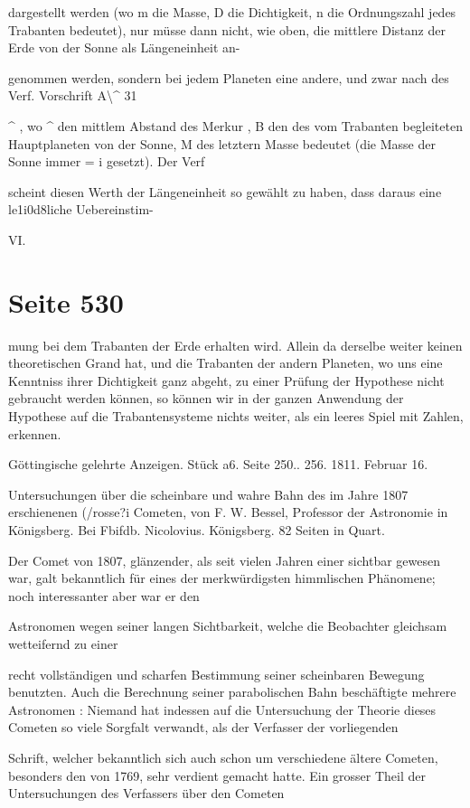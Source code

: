 \documentclass[10pt,a4paper]{article}
\begin{document}
dargestellt werden (wo m die Masse, D die Dichtigkeit, n die Ordnungszahl jedes Trabanten bedeutet), nur müsse dann nicht, wie oben, die mittlere Distanz der Erde von der Sonne als Längeneinheit an-

genommen werden, sondern bei jedem Planeten eine andere, und zwar nach des Verf. Vorschrift A\textbackslash{}\textasciicircum{} 31

\textasciicircum{} , wo \textasciicircum{} den mittlem Abstand des Merkur , B den des vom Trabanten begleiteten Hauptplaneten von der Sonne, M des letztern Masse bedeutet (die Masse der Sonne immer = i gesetzt). Der Verf

scheint diesen Werth der Längeneinheit so gewählt zu haben, dass daraus eine le1i0d8liche Uebereinstim-

VI.


\newpage
\section*{Seite 530}
mung bei dem Trabanten der Erde erhalten wird. Allein da derselbe weiter keinen theoretischen Grand hat, und die Trabanten der andern Planeten, wo uns eine Kenntniss ihrer Dichtigkeit ganz abgeht, zu einer Prüfung der Hypothese nicht gebraucht werden können, so können wir in der ganzen Anwendung der Hypothese auf die Trabantensysteme nichts weiter, als ein leeres Spiel mit Zahlen, erkennen.

Göttingische gelehrte Anzeigen. Stück a6. Seite 250.. 256. 1811. Februar 16.

Untersuchungen über die scheinbare und wahre Bahn des im Jahre 1807 erschienenen (/rosse?i Cometen, von F. W. Bessel, Professor der Astronomie in Königsberg. Bei Fbifdb. Nicolovius. Königsberg. 82 Seiten in Quart.

Der Comet von 1807, glänzender, als seit vielen Jahren einer sichtbar gewesen war, galt bekanntlich für eines der merkwürdigsten himmlischen Phänomene; noch interessanter aber war er den

Astronomen wegen seiner langen Sichtbarkeit, welche die Beobachter gleichsam wetteifernd zu einer

recht vollständigen und scharfen Bestimmung seiner scheinbaren Bewegung benutzten. Auch die Berechnung seiner parabolischen Bahn beschäftigte mehrere Astronomen : Niemand hat indessen auf die Untersuchung der Theorie dieses Cometen so viele Sorgfalt verwandt, als der Verfasser der vorliegenden

Schrift, welcher bekanntlich sich auch schon um verschiedene ältere Cometen, besonders den von 1769, sehr verdient gemacht hatte. Ein grosser Theil der Untersuchungen des Verfassers über den Cometen
\end{document}
